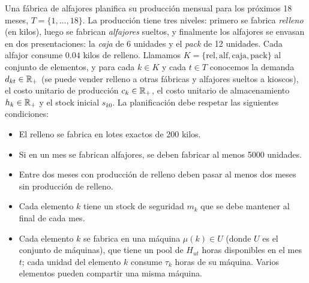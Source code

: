 \documentclass[11pt,a4paper]{article}
\begin{document}
\newpage
Una fábrica de alfajores planifica su producción mensual para los próximos 18
meses, $T = \{1,\dots,18\}$. La producción tiene tres niveles: primero se
fabrica \emph{relleno} (en kilos), luego se fabrican \emph{alfajores} sueltos, y
finalmente los alfajores se envasan en dos presentaciones: la \emph{caja} de 6
unidades y el \emph{pack} de 12 unidades. Cada alfajor consume $0.04$ kilos de
relleno. Llamamos $K = \{\mathrm{rel}, \mathrm{alf}, \mathrm{caja},
\mathrm{pack}\}$ al conjunto de elementos, y para cada $k \in K$ y cada
$t \in T$ conocemos la demanda $d_{kt} \in \mathbb{R}_+$ (se puede vender relleno a otras
fábricas y alfajores sueltos a kioscos), el costo unitario de producción
$c_{k} \in \mathbb{R}_+$, el costo unitario de almacenamiento $h_k \in \mathbb{R}_+$ y el stock
inicial $s_{k0}$. La planificación debe respetar las siguientes condiciones:

\begin{itemize}
  \item El relleno se fabrica en lotes exactos de 200 kilos.
  \item Si en un mes se fabrican alfajores, se deben fabricar al menos 5000
  unidades.
  \item Entre dos meses con producción de relleno deben pasar al menos dos meses
  sin producción de relleno.
  \item Cada elemento $k$ tiene un stock de seguridad $m_k$ que se debe mantener
  al final de cada mes.
  \item Cada elemento $k$ se fabrica en una máquina $\mu(k) \in U$ (donde $U$ es
  el conjunto de máquinas), que tiene un pool de $H_{ut}$ horas disponibles en
  el mes $t$; cada unidad del elemento $k$ consume $\tau_k$ horas de su máquina.
  Varios elementos pueden compartir una misma máquina.
\end{itemize}
\end{document}
